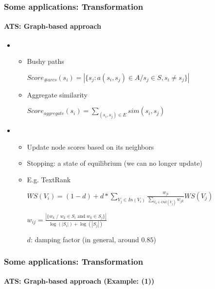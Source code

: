 \documentclass[xcolor=table]{beamer}
\begin{document}
\begin{frame}
	\frametitle{Some applications: Transformation}
	\framesubtitle{ATS: Graph-based approach}
	
	\begin{itemize}
		\item {}
		\begin{itemize}
			\item Bushy paths 
			
			\hspace{.5cm}$Score_{\#arcs}(s_i) = |\{ s_j : a(s_i, s_j) \in A / s_j \in S, s_i \neq s_j \}|$
			
			\item Aggregate similarity
			
			\hspace{.5cm}$Score_{aggregate}(s_i) = \sum\limits_{(s_i, s_j) \in E} sim(s_i, s_j)$
		\end{itemize}
		\item {}
		\begin{itemize}
			\item Update node scores based on its neighbors
			\item Stopping: a state of equilibrium (we can no longer update)
			\item E.g. TextRank \cite{04-mihalcea-tarau}
			
			$WS(V_i) = ( 1 - d) + d * \sum\limits_{V_j \in In(V_i)} \frac{w_{ji}}{\sum\limits_{V_k \in Out(V_j)} w_{jk}} WS(V_j)$
			
			$w_{ij} = \frac{|\{w_k \text{ / } w_k \in S_i \text{ and } w_k \in S_j\}|}{\log(|S_i|) + \log(|S_j|)}$
			
			$ d $: damping factor (in general, around $ 0.85 $)
		\end{itemize}
	\end{itemize}

\end{frame}

\begin{frame}
	\frametitle{Some applications: Transformation}
	\framesubtitle{ATS: Graph-based approach (Example: \cite{21-aries-al} (1))}
	
	\begin{center}
	\end{center}
	
\end{frame}
\end{document}

